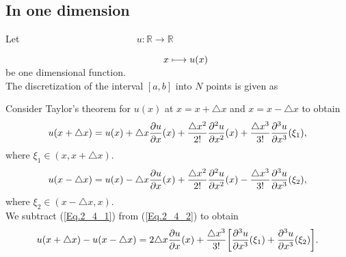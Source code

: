 \subsection*{In one dimension}
Let $\hspace{5cm} u:\mathbb{R} \longrightarrow \mathbb{R}$
\par
$ \hspace{5.8cm} x \longmapsto u(x)$
\\
be one dimensional function.
\\
The discretization of the interval $[a, b]$ into $N$ points is given as
\begin{center}
\end{center}
Consider Taylor's theorem for $u(x)$ at $x=x + \triangle x $ and $x = x - \triangle x $ to obtain
\begin{align}{\label{Eq.2_4_1}}
u(x + \triangle x ) = u(x) + \triangle x \dfrac{\partial u}{\partial x }(x) + \dfrac{\triangle x^{2}}{2!} \dfrac{\partial^{2} u}{\partial x^{2} }(x) + \dfrac{\triangle x^{3}}{3!} \dfrac{\partial^{3} u}{\partial x^{3} }(\xi_{1}),
\end{align}
where $ \xi_{1} \in (x , x + \triangle x)$.
\begin{align}{\label{Eq.2_4_2}}
u(x - \triangle x ) = u(x) - \triangle x \dfrac{\partial u}{\partial x }(x) + \dfrac{\triangle x^{2}}{2!} \dfrac{\partial^{2} u}{\partial x^{2} }(x) - \dfrac{\triangle x^{3}}{3!} \dfrac{\partial^{3} u}{\partial x^{3} }(\xi_{2}),
\end{align}
where $ \xi_{2} \in ( x - \triangle x, x )$.
\\
We subtract (\ref{Eq.2_4_1}) from (\ref{Eq.2_4_2}) to obtain
\begin{align} {\label{Eq.2_4_3}}
u(x + \triangle x ) - u(x - \triangle x ) =  2 \triangle x \dfrac{\partial u}{\partial x }(x) +  \dfrac{\triangle x^{3}}{3!} \bigg[ \dfrac{\partial^{3} u}{\partial x^{3} }(\xi_{1}) + \dfrac{\partial^{3} u}{\partial x^{3} }(\xi_{2}) \bigg].
\end{align}
